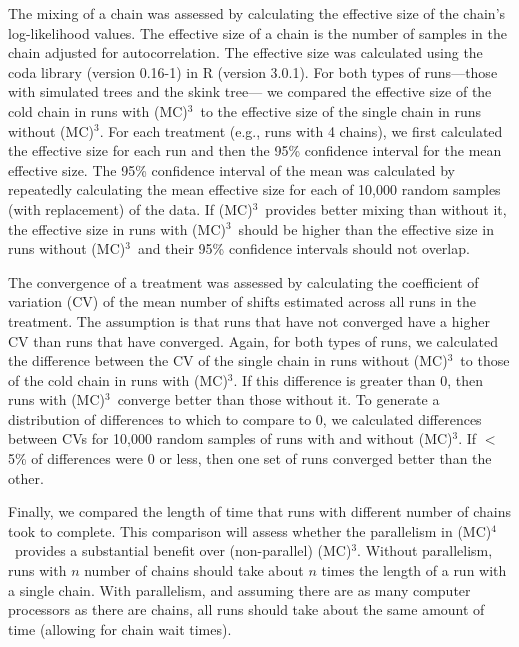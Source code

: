 \documentclass[12pt]{article}
\newcommand{\MCMCMC}{(MC)$^{3}$}
\newcommand{\MCMCMCMC}{(MC)$^{4}$}
\begin{document}
The mixing of a chain was assessed by calculating
the effective size of the chain's log-likelihood values.
%
The effective size of a chain is the number of samples
in the chain adjusted for autocorrelation.
%
The effective size was calculated using
the coda library (version 0.16-1) in R (version 3.0.1).
%
For both types of runs---those with simulated trees and the skink tree---%
we compared the effective size of the cold chain in runs with \MCMCMC\ 
to the effective size of the single chain in runs without \MCMCMC.
%
For each treatment (e.g., runs with 4 chains),
we first calculated the effective size for each run
and then the 95\% confidence interval for the mean effective size.
%
The 95\% confidence interval of the mean was calculated
by repeatedly calculating the mean effective size
for each of 10,000 random samples (with replacement) of the data.
%
If \MCMCMC\ provides better mixing than without it,
the effective size in runs with \MCMCMC\ should be higher
than the effective size in runs without \MCMCMC\ 
and their 95\% confidence intervals should not overlap.


The convergence of a treatment was assessed
by calculating the coefficient of variation (CV) of the mean number of shifts
estimated across all runs in the treatment.
%
The assumption is that runs that have not converged
have a higher CV than runs that have converged.
%
Again, for both types of runs,
we calculated the difference between the CV
of the single chain in runs without \MCMCMC\ 
to those of the cold chain in runs with \MCMCMC.
%
If this difference is greater than 0,
then runs with \MCMCMC\ converge better than those without it.
%
To generate a distribution of differences to which to compare to 0,
we calculated differences between CVs for 10,000 random samples
of runs with and without \MCMCMC.
%
If $<$ 5\% of differences were 0 or less, then
one set of runs converged better than the other.


Finally, we compared the length of time that runs
with different number of chains took to complete.
%
This comparison will assess whether the parallelism in \MCMCMCMC\ 
provides a substantial benefit over (non-parallel) \MCMCMC.
%
Without parallelism, runs with $n$ number of chains
should take about $n$ times the length of a run with a single chain.
%
With parallelism, and assuming there are as many computer processors
as there are chains, all runs should take about the same amount of time
(allowing for chain wait times).


\end{document}
